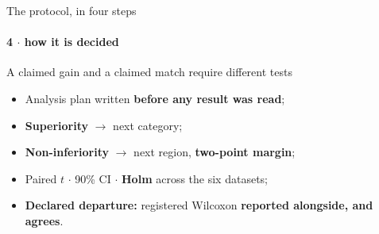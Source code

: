 \documentclass{beamer}
\begin{document}
\begin{frame}{The protocol, in four steps}
    \framesubtitle{4 $\cdot$ how it is decided}

    \begin{block}{}
        \centering\large
        A claimed gain and a claimed match require different tests
    \end{block}

    \bigskip
    \begin{itemize}
        \item Analysis plan written \textbf{before any result was read};
        \item \textbf{Superiority} $\rightarrow$ next category;
        \item \textbf{Non-inferiority} $\rightarrow$ next region, \textbf{two-point margin};
        \item Paired $t$ $\cdot$ 90\% CI $\cdot$ \textbf{Holm} across the six datasets;
        \item \textbf{Declared departure:} registered Wilcoxon \textbf{reported alongside, and agrees}.
    \end{itemize}
\end{frame}
\end{document}

